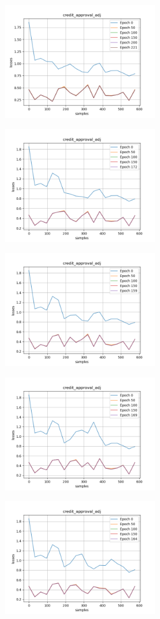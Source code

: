 \includegraphics[width=0.5\textwidth]{./figures/proj_credit_approval_adj_3.png}

\includegraphics[width=0.5\textwidth]{./figures/proj_credit_approval_adj_4.png}

\includegraphics[width=0.5\textwidth]{./figures/proj_credit_approval_adj_5.png}

\includegraphics[width=0.5\textwidth]{./figures/proj_credit_approval_adj_6.png}

\includegraphics[width=0.5\textwidth]{./figures/proj_credit_approval_adj_7.png}

